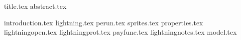 \documentclass[11pt]{llncs}
\begin{document}
{title.tex}
\thispagestyle{plain}
{abstract.tex}

{introduction.tex}
{lightning.tex}
{perun.tex}
{sprites.tex}
{properties.tex}
{lightningopen.tex}
{lightningprot.tex}
{payfunc.tex}
{lightningnotes.tex}
{model.tex}

\end{document}
